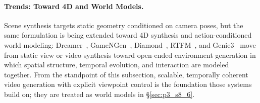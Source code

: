 \paragraph{Trends: Toward 4D and World Models.}
Scene synthesis targets static geometry conditioned on camera poses, but the same formulation is being extended toward 4D synthesis and action-conditioned world modeling: Dreamer~\cite{hafner2019dreamer}, GameNGen~\cite{valevski2024diffusion}, Diamond~\cite{alonso2024diffusionworldmodelingvisual}, RTFM~\cite{worldlabs_rtfm}, and Genie3~\cite{genie3} move from static view or video synthesis toward open-ended environment generation in which spatial structure, temporal evolution, and interaction are modeled together.
From the standpoint of this subsection, scalable, temporally coherent video generation with explicit viewpoint control is the foundation those systems build on; they are treated as world models in §\ref{sec:p3_s8_6}.
